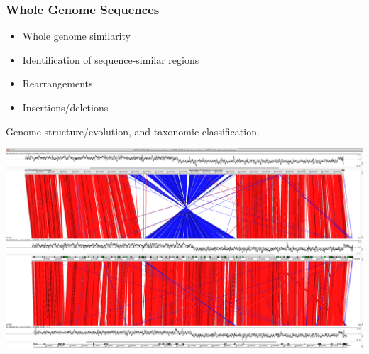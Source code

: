 \begin{frame}
  \frametitle{Whole Genome Sequences}
  \begin{itemize}
    \item Whole genome similarity
    \item Identification of sequence-similar regions
    \item Rearrangements
    \item Insertions/deletions
  \end{itemize}    
  Genome structure/evolution, and taxonomic classification.
  \begin{center}
    \includegraphics[height=0.4\textheight]{images/act_comparison}
  \end{center}  
\end{frame}


